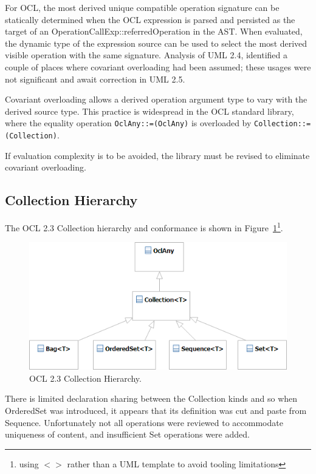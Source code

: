 \documentclass{eceasst}
\begin{document}
For OCL, the most derived unique compatible operation signature can be statically determined when the OCL expression is parsed and persisted as the target of an OperationCallExp::referredOperation in the AST. When evaluated, the dynamic type of the expression source can be used to select the most derived visible operation with the same signature. Analysis of UML 2.4, identified a couple of places where covariant overloading had been assumed; these usages were not significant and await correction in UML 2.5.

Covariant overloading allows a derived operation argument type to vary with the derived source type. This practice is widespread in the OCL standard library, where the equality operation \verb|OclAny::=(OclAny)| is overloaded by \verb|Collection::=(Collection)|.

If evaluation complexity is to be avoided, the library must be revised to eliminate covariant overloading.

\subsection{Collection Hierarchy}

The OCL 2.3 Collection hierarchy and conformance is shown in Figure~\ref{fig:Collections_2_2}\footnote{using $< >$ rather than a UML template to avoid tooling limitations}.

\begin{figure}
  \begin{center}
    \includegraphics[width=5.0in]{Collections_2_2.png}
  \end{center}
  \caption{OCL 2.3 Collection Hierarchy.}
  \label{fig:Collections_2_2}
\end{figure}

There is limited declaration sharing between the Collection kinds and so when OrderedSet was introduced, it appears that its definition was cut and paste from Sequence. Unfortunately not all operations were reviewed to accommodate uniqueness of content, and insufficient Set operations were added. 
\end{document}

